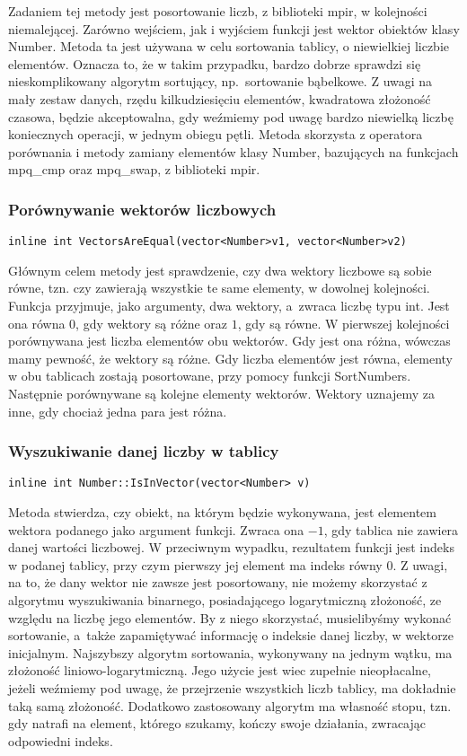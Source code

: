 Zadaniem tej metody jest posortowanie liczb, z biblioteki mpir, w kolejności niemalejącej. Zarówno wejściem, jak i wyjściem funkcji jest wektor obiektów klasy Number. Metoda ta jest używana w celu sortowania tablicy, o niewielkiej liczbie elementów. Oznacza to, że w takim przypadku, bardzo dobrze sprawdzi się nieskomplikowany algorytm sortujący, np.\ sortowanie bąbelkowe. Z uwagi na mały zestaw danych, rzędu kilkudziesięciu elementów, kwadratowa złożoność czasowa, będzie akceptowalna, gdy weźmiemy pod uwagę bardzo niewielką liczbę koniecznych operacji, w jednym obiegu pętli. Metoda skorzysta z operatora porównania i metody zamiany elementów klasy Number, bazujących na funkcjach mpq\_cmp oraz mpq\_swap, z biblioteki mpir.

\subsubsection{Porównywanie wektorów liczbowych}
\begin{lstlisting}
inline int VectorsAreEqual(vector<Number>v1, vector<Number>v2)
\end{lstlisting}

Głównym celem metody jest sprawdzenie, czy dwa wektory liczbowe są sobie równe, tzn. czy zawierają wszystkie te same elementy, w dowolnej kolejności. Funkcja przyjmuje, jako argumenty, dwa wektory, a~zwraca liczbę typu int. Jest ona równa $0$, gdy wektory są różne oraz $1$, gdy są równe. W pierwszej kolejności porównywana jest liczba elementów obu wektorów. Gdy jest ona różna, wówczas mamy pewność, że wektory są różne. Gdy liczba elementów jest równa, elementy w obu tablicach zostają posortowane, przy pomocy funkcji SortNumbers. Następnie porównywane są kolejne elementy wektorów. Wektory uznajemy za inne, gdy chociaż jedna para jest różna.

\subsubsection{Wyszukiwanie danej liczby w tablicy}
\begin{lstlisting}
inline int Number::IsInVector(vector<Number> v)
\end{lstlisting}

Metoda stwierdza, czy obiekt, na którym będzie wykonywana, jest elementem wektora podanego jako argument funkcji. Zwraca ona $-1$, gdy tablica nie zawiera danej wartości liczbowej. W przeciwnym wypadku, rezultatem funkcji jest indeks w podanej tablicy, przy czym pierwszy jej element ma indeks równy $0$. Z uwagi, na to, że dany wektor nie zawsze jest posortowany, nie możemy skorzystać z algorytmu wyszukiwania binarnego, posiadającego logarytmiczną złożoność, ze względu na liczbę jego elementów. By z niego skorzystać, musielibyśmy wykonać sortowanie, a~także zapamiętywać informację o indeksie danej liczby, w wektorze inicjalnym. Najszybszy algorytm sortowania, wykonywany na jednym wątku, ma złożoność liniowo-logarytmiczną. Jego użycie jest wiec zupełnie nieopłacalne, jeżeli weźmiemy pod uwagę, że przejrzenie wszystkich liczb tablicy, ma dokładnie taką samą złożoność. Dodatkowo zastosowany algorytm ma własność stopu, tzn. gdy natrafi na element, którego szukamy, kończy swoje działania, zwracając odpowiedni indeks.

